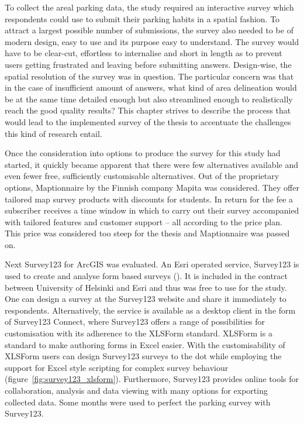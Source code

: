 To collect the areal parking data, the study required an interactive survey which respondents could use to submit their parking habits in a spatial fashion. To attract a largest possible number of submissions, the survey also needed to be of modern design, easy to use and its purpose easy to understand. The survey would have to be clear-cut, effortless to internalise and short in length as to prevent users getting frustrated and leaving before submitting answers. Design-wise, the spatial resolution of the survey was in question. The particular concern was that in the case of insufficient amount of answers, what kind of area delineation would be at the same time detailed enough but also streamlined enough to realistically reach the good quality results? This chapter strives to describe the process that would lead to the implemented survey of the thesis to accentuate the challenges this kind of research entail.

Once the consideration into options to produce the survey for this study had started, it quickly became apparent that there were few alternatives available and even fewer free, sufficiently customisable alternatives. Out of the proprietary options, Maptionnaire by the Finnish company Mapita was considered. They offer tailored map survey products with discounts for students. In return for the fee a subscriber receives a time window in which to carry out their survey accompanied with tailored features and customer support -- all according to the price plan. This price was considered too steep for the thesis and Maptionnaire was passed on. 

Next Survey123 for ArcGIS was evaluated. An Esri operated service, Survey123 is used to create and analyse form based surveys (\cite{Esri}). It is included in the contract between University of Helsinki and Esri and thus was free to use for the study. One can design a survey at the Survey123 website and share it immediately to respondents. Alternatively, the service is available as a desktop client in the form of Survey123 Connect, where Survey123 offers a range of possibilities for customisation with its adherence to the XLSForm standard. XLSForm is a standard to make authoring forms in Excel easier. With the customisability of XLSForm users can design Survey123 surveys to the dot while employing the support for Excel style scripting for complex survey behaviour (figure~\ref{fig:survey123_xlsform}). Furthermore, Survey123 provides online tools for collaboration, analysis and data viewing with many options for exporting collected data. Some months were used to perfect the parking survey with Survey123. 

